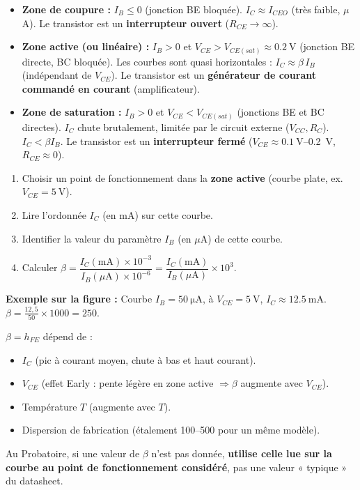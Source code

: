 \documentclass[11pt]{article}
\begin{document}
\begin{definition}
\begin{itemize}
    \item \textbf{Zone de coupure :} $I_B \le 0$ (jonction BE bloquée). $I_C \approx I_{CEO}$ (très faible, $\mu$A). Le transistor est un \textbf{interrupteur ouvert} ($R_{CE} \to \infty$).
    \item \textbf{Zone active (ou linéaire) :} $I_B > 0$ et $V_{CE} > V_{CE(sat)} \approx \SI{0,2}{\volt}$ (jonction BE directe, BC bloquée). Les courbes sont quasi horizontales : $I_C \approx \beta \, I_B$ (indépendant de $V_{CE}$). Le transistor est un \textbf{générateur de courant commandé en courant} (amplificateur).
    \item \textbf{Zone de saturation :} $I_B > 0$ et $V_{CE} < V_{CE(sat)}$ (jonctions BE et BC directes). $I_C$ chute brutalement, limitée par le circuit externe ($V_{CC}, R_C$). $I_C < \beta I_B$. Le transistor est un \textbf{interrupteur fermé} ($V_{CE} \approx \SI{0,1}{\volt}$--\SI{0,2}{\volt}, $R_{CE} \approx 0$).
\end{itemize}
\end{definition}

\begin{methode}
\begin{enumerate}
    \item Choisir un point de fonctionnement dans la \textbf{zone active} (courbe plate, ex. $V_{CE} = \SI{5}{\volt}$).
    \item Lire l'ordonnée $I_C$ (en mA) sur cette courbe.
    \item Identifier la valeur du paramètre $I_B$ (en $\mu$A) de cette courbe.
    \item Calculer $\beta = \dfrac{I_C(\text{mA}) \times 10^{-3}}{I_B(\mu\text{A}) \times 10^{-6}} = \dfrac{I_C(\text{mA})}{I_B(\mu\text{A})} \times 10^3$.
\end{enumerate}
\textbf{Exemple sur la figure :} Courbe $I_B = \SI{50}{\micro\ampere}$, à $V_{CE}=\SI{5}{\volt}$, $I_C \approx \SI{12,5}{\milli\ampere}$. $\beta = \frac{12,5}{50} \times 1000 = 250$.
\end{methode}

\begin{attention}
$\beta = h_{FE}$ dépend de :
\begin{itemize}
    \item $I_C$ (pic à courant moyen, chute à bas et haut courant).
    \item $V_{CE}$ (effet Early : pente légère en zone active $\Rightarrow \beta$ augmente avec $V_{CE}$).
    \item Température $T$ (augmente avec $T$).
    \item Dispersion de fabrication (étalement 100--500 pour un même modèle).
\end{itemize}
Au Probatoire, si une valeur de $\beta$ n'est pas donnée, \textbf{utilise celle lue sur la courbe au point de fonctionnement considéré}, pas une valeur « typique » du datasheet.
\end{attention}
\end{document}
